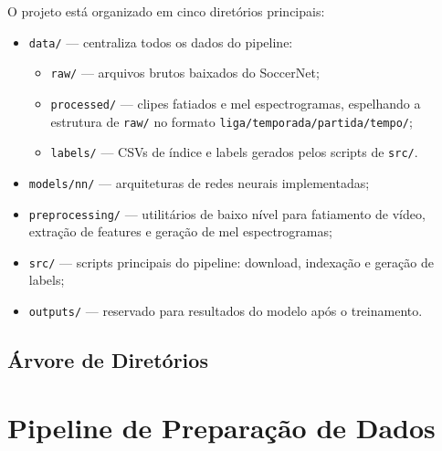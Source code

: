 \documentclass[12pt, a4paper]{article}
\begin{document}
O projeto está organizado em cinco diretórios principais:

\begin{itemize}
    \item \texttt{data/} — centraliza todos os dados do pipeline:
    \begin{itemize}
        \item \texttt{raw/} — arquivos brutos baixados do SoccerNet;
        \item \texttt{processed/} — clipes fatiados e mel espectrogramas, espelhando a estrutura de \texttt{raw/} no formato \texttt{liga/temporada/partida/tempo/};
        \item \texttt{labels/} — CSVs de índice e labels gerados pelos scripts de \texttt{src/}.
    \end{itemize}
    \item \texttt{models/nn/} — arquiteturas de redes neurais implementadas;
    \item \texttt{preprocessing/} — utilitários de baixo nível para fatiamento de vídeo, extração de features e geração de mel espectrogramas;
    \item \texttt{src/} — scripts principais do pipeline: download, indexação e geração de labels;
    \item \texttt{outputs/} — reservado para resultados do modelo após o treinamento.
\end{itemize}

\newpage

\subsection{Árvore de Diretórios}

\bigskip


\newpage
\section{Pipeline de Preparação de Dados}
\end{document}
